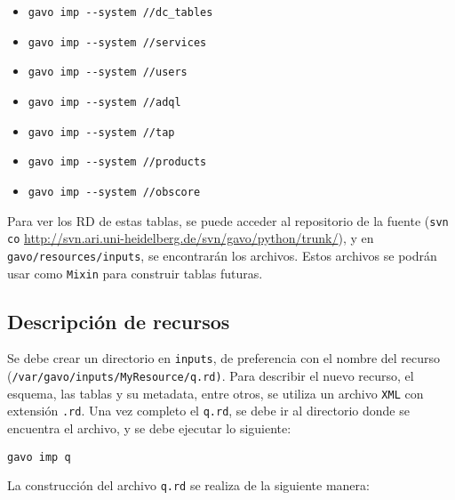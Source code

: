 \begin{itemize}
	\item \verb;gavo imp --system //dc_tables;
	\item \verb;gavo imp --system //services;
	\item \verb;gavo imp --system //users;
	\item \verb;gavo imp --system //adql;
	\item \verb;gavo imp --system //tap;
	\item \verb;gavo imp --system //products;
	\item \verb;gavo imp --system //obscore;
\end{itemize}

Para ver los RD de estas tablas, se puede acceder al repositorio de la fuente (\verb;svn co; \url{http://svn.ari.uni-heidelberg.de/svn/gavo/python/trunk/}), y en \verb;gavo/resources/inputs;, se encontrarán los archivos. Estos archivos se podrán usar como \verb;Mixin; para construir tablas futuras.

\subsection*{Descripción de recursos}

Se debe crear un directorio en \verb;inputs;, de preferencia con el nombre del recurso (\verb;/var/gavo/inputs/MyResource/q.rd);. Para describir el nuevo recurso, el esquema, las tablas y su metadata, entre otros, se utiliza un archivo \verb;XML; con extensión \verb;.rd;. Una vez completo el \verb;q.rd;, se debe ir al directorio donde se encuentra el archivo, y se debe ejecutar lo siguiente:

\begin{verbatim}
gavo imp q
\end{verbatim}

La construcción del archivo \verb;q.rd; se realiza de la siguiente manera:

